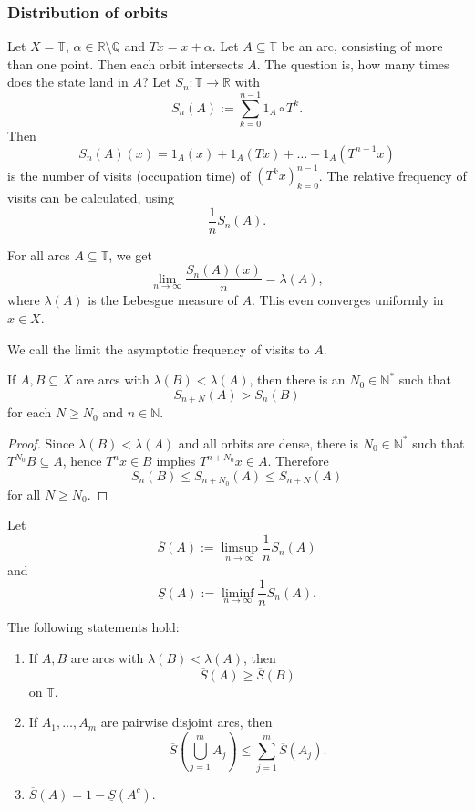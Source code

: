 \documentclass{article}
\newcommand*{\N}{\mathbb{N}}
\newcommand*{\Q}{\mathbb{Q}}
\newcommand*{\R}{\mathbb{R}}
\newcommand*{\T}{\mathbb{T}}
\newcommand*{\Ns}{\N^*}
\newcommand*{\reci}[1]{{\frac{1}{#1}}}
\newcommand*{\limn}{\lim_{n\to\infty}}
\begin{document}
\subsubsection{Distribution of orbits}

Let $X = \T$, $\alpha \in \R\setminus\Q$ and $Tx=x+\alpha$. Let $A\subseteq \T$ be an arc, consisting of more than one point. Then each orbit intersects $A$. The question is, how many times does the state land in $A$? Let $S_n:\T\to \R$ with
$$S_n(A):=\sum_{k=0}^{n-1}1_A\circ T^k.$$
Then
$$S_n(A)(x)=1_A(x)+1_A(Tx)+\dots+1_A(T^{n-1}x)$$
is the number of visits (occupation time) of $(T^kx)_{k=0}^{n-1}$. The relative frequency of visits can be calculated, using
$$\reci nS_n(A).$$

\begin{prop}
    For all arcs $A\subseteq \T$, we get
    $$\limn\frac{S_n(A)(x)}n = \lambda(A),$$
    where $\lambda(A)$ is the Lebesgue measure of $A$. This even converges uniformly in $x\in X$.
\end{prop}

\begin{defin}
    We call the limit the asymptotic frequency of visits to $A$.
\end{defin}

\begin{lem}
    If $A,B\subseteq X$ are arcs with $\lambda(B) < \lambda(A)$, then there is an $N_0\in\Ns$ such that
    $$S_{n+N}(A) > S_n(B)$$
    for each $N\geq N_0$ and $n\in\N$.
    \label{Monotonicity}
\end{lem}

\begin{proof}
    Since $\lambda(B)<\lambda(A)$ and all orbits are dense, there is $N_0 \in\Ns$ such that $T^{N_0}B\subseteq A$, hence $T^nx\in B$ implies $T^{n+N_0}x\in A$. Therefore
    $$S_n(B)\leq S_{n+N_0}(A) \leq S_{n+N}(A)$$
    for all $N \geq N_0$.
\end{proof}

Let
$$\overline S(A) := \limsup_{n \to \infty} \reci nS_n(A)$$
and
$$\underline S(A) := \liminf_{n \to \infty} \reci nS_n(A).$$

\begin{lem}
    The following statements hold:
    \begin{enumerate}
        \item If $A,B$ are arcs with $\lambda(B) < \lambda(A)$, then
        $$\overline S(A) \geq \overline S(B)$$
        on $\T$.

        \item If $A_1,\dots,A_m$ are pairwise disjoint arcs, then
        $$\overline S\left(\bigcup_{j=1}^mA_j\right) \leq \sum_{j=1}^m \overline S(A_j).$$

        \item $\overline S(A) = 1-\underline S(A^c)$.
    \end{enumerate}
\end{lem}
\end{document}
